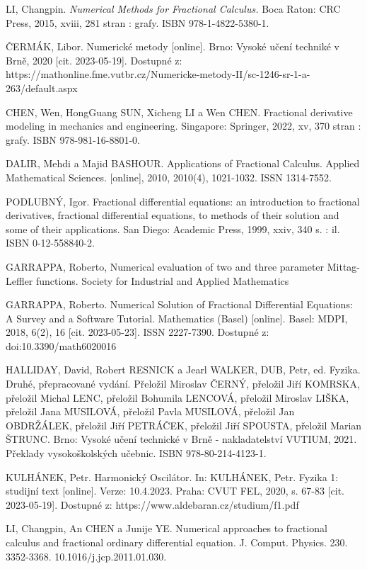 \documentclass[a4paper,12pt,twoside]{article}
\theoremstyle{definition}
\theoremstyle{remark}
\numberwithin{equation}{section}
\numberwithin{table}{section}
\numberwithin{figure}{section}
\begin{document}
\newpage
\newpage
\begin{thebibliography}{12}
 LI, Changpin. {\em Numerical Methods for Fractional Calculus.} Boca Raton: CRC Press, 2015, xviii, 281 stran : grafy. ISBN 978-1-4822-5380-1.
	
 ČERMÁK, Libor. Numerické metody [online]. Brno: Vysoké učení techniké v Brně, 2020 [cit. 2023-05-19]. Dostupné z: https://mathonline.fme.vutbr.cz/Numericke-metody-II/sc-1246-sr-1-a-263/default.aspx	
		

 CHEN, Wen, HongGuang SUN, Xicheng LI a Wen CHEN. Fractional derivative modeling in mechanics and engineering. Singapore: Springer, 2022, xv, 370 stran : grafy. ISBN 978-981-16-8801-0.

DALIR, Mehdi a Majid BASHOUR. Applications of Fractional Calculus. Applied Mathematical Sciences. [online], 2010, 2010(4), 1021-1032. ISSN 1314-7552.


PODLUBNÝ, Igor. Fractional differential equations: an introduction to fractional derivatives, fractional differential equations, to methods of their solution and some of their applications. San Diego: Academic Press, 1999, xxiv, 340 s. : il. ISBN 0-12-558840-2.

 GARRAPPA, Roberto, Numerical evaluation of two and three parameter Mittag-Leffler functions. Society for Industrial and Applied Mathematics

 GARRAPPA, Roberto. Numerical Solution of Fractional Differential Equations: A Survey and a Software Tutorial. Mathematics (Basel) [online]. Basel: MDPI, 2018, 6(2), 16 [cit. 2023-05-23]. ISSN 2227-7390. Dostupné z: doi:10.3390/math6020016

 HALLIDAY, David, Robert RESNICK a Jearl WALKER, DUB, Petr, ed. Fyzika. Druhé, přepracované vydání. Přeložil Miroslav ČERNÝ, přeložil Jiří KOMRSKA, přeložil Michal LENC, přeložil Bohumila LENCOVÁ, přeložil Miroslav LIŠKA, přeložil Jana MUSILOVÁ, přeložil Pavla MUSILOVÁ, přeložil Jan OBDRŽÁLEK, přeložil Jiří PETRÁČEK, přeložil Jiří SPOUSTA, přeložil Marian ŠTRUNC. Brno: Vysoké učení technické v Brně - nakladatelství VUTIUM, 2021. Překlady vysokoškolských učebnic. ISBN 978-80-214-4123-1.

 KULHÁNEK, Petr. Harmonický Oscilátor. In: KULHÁNEK, Petr. Fyzika 1: studijní text [online]. Verze: 10.4.2023. Praha: CVUT FEL, 2020, s. 67-83 [cit. 2023-05-19]. Dostupné z: https://www.aldebaran.cz/studium/f1.pdf

 LI, Changpin, An CHEN a Junije YE. Numerical approaches to fractional calculus and fractional ordinary differential equation. J. Comput. Physics. 230. 3352-3368. 10.1016/j.jcp.2011.01.030. 


\end{thebibliography}
\end{document}
